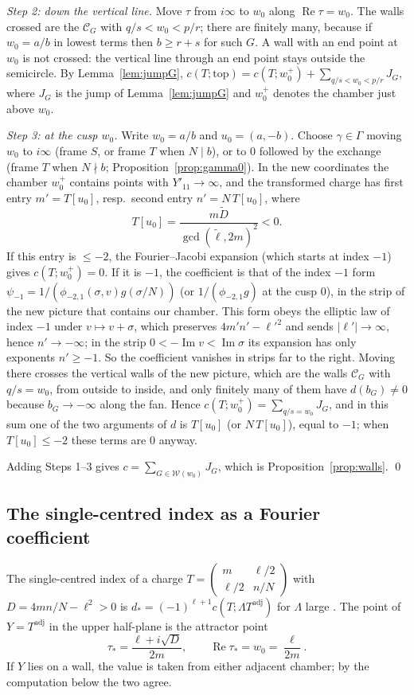 \documentclass[11pt]{amsart}
\numberwithin{equation}{section}
\theoremstyle{plain}
\theoremstyle{definition}
\theoremstyle{remark}
\newcommand{\pmi}{\phi_{-2,1}}
\newcommand{\sm}[4]{\left(\begin{smallmatrix}#1&#2\\#3&#4\end{smallmatrix}\right)}
\begin{document}
\emph{Step 2: down the vertical line.} Move $\tau$ from $i\infty$ to $w_0$ along $\operatorname{Re}\tau=w_0$. The walls crossed are the $\mathcal C_G$ with $q/s<w_0<p/r$; there are finitely many, because if $w_0=a/b$ in lowest terms then $b\ge r+s$ for such $G$. A wall with an end point at $w_0$ is not crossed: the vertical line through an end point stays outside the semicircle. By Lemma~\ref{lem:jumpG}, $c(T;\text{top})=c(T;w_0^+)+\sum_{q/s<w_0<p/r}J_G$, where $J_G$ is the jump of Lemma~\ref{lem:jumpG} and $w_0^+$ denotes the chamber just above $w_0$.

\emph{Step 3: at the cusp $w_0$.} Write $w_0=a/b$ and $u_0=(a,-b)$. Choose $\gamma\in\Gamma$ moving $w_0$ to $i\infty$ (frame $S$, or frame $T$ when $N\mid b$), or to $0$ followed by the exchange (frame $T$ when $N\nmid b$; Proposition~\ref{prop:gamma0}). In the new coordinates the chamber $w_0^+$ contains points with $Y'_{11}\to\infty$, and the transformed charge has first entry $m'=T[u_0]$, resp.\ second entry $n'=N\,T[u_0]$, where
\[
T[u_0]=\frac{m\tilde D}{\gcd(\tilde\ell,2m)^2}<0 .
\]
If this entry is $\le-2$, the Fourier--Jacobi expansion (which starts at index $-1$) gives $c(T;w_0^+)=0$. If it is $-1$, the coefficient is that of the index $-1$ form $\psi_{-1}=1/(\pmi(\sigma,v)g(\sigma/N))$ (or $1/(\pmi g)$ at the cusp $0$), in the strip of the new picture that contains our chamber. This form obeys the elliptic law of index $-1$ under $v\mapsto v+\sigma$, which preserves $4m'n'-\ell'^2$ and sends $|\ell'|\to\infty$, hence $n'\to-\infty$; in the strip $0<-\operatorname{Im}v<\operatorname{Im}\sigma$ its expansion has only exponents $n'\ge-1$. So the coefficient vanishes in strips far to the right. Moving there crosses the vertical walls of the new picture, which are the walls $\mathcal C_G$ with $q/s=w_0$, from outside to inside, and only finitely many of them have $d(b_G)\ne0$ because $b_G\to-\infty$ along the fan. Hence $c(T;w_0^+)=\sum_{q/s=w_0}J_G$, and in this sum one of the two arguments of $d$ is $T[u_0]$ (or $N\,T[u_0]$), equal to $-1$; when $T[u_0]\le-2$ these terms are $0$ anyway.

Adding Steps 1--3 gives $c=\sum_{G\in\mathcal W(w_0)}J_G$, which is Proposition~\ref{prop:walls}. \qed

\subsection{The single-centred index as a Fourier coefficient}
The single-centred index of a charge $T=\sm m{\ell/2}{\ell/2}{n/N}$ with $D=4mn/N-\ell^2>0$ is $d_*=(-1)^{\ell+1}c(T;\Lambda T^{\mathrm{adj}})$ for $\Lambda$ large \cite{Sen08,Sen11}. The point of $Y=T^{\mathrm{adj}}$ in the upper half-plane is the attractor point
\[
\tau_*=\frac{\ell+i\sqrt D}{2m},\qquad\operatorname{Re}\tau_*=w_0=\frac{\ell}{2m}.
\]
If $Y$ lies on a wall, the value is taken from either adjacent chamber; by the computation below the two agree.
\end{document}
